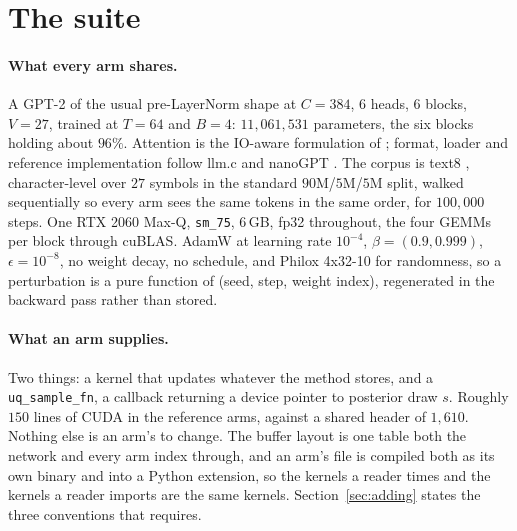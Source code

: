 \section{The suite}
\label{sec:suite}


\paragraph{What every arm shares.}
A GPT-2 \citep{radford2019language} of the usual pre-LayerNorm shape
\citep{vaswani2017attention} at $C = 384$, $6$ heads, $6$ blocks, $V = 27$, trained at
$T = 64$ and $B = 4$: $11{,}061{,}531$ parameters, the six blocks holding about
$96\%$. Attention is the IO-aware formulation of \citet{dao2022flashattention};
format, loader and reference implementation follow llm.c \citep{karpathy2024llmc} and
nanoGPT \citep{karpathy2022nanogpt}. The corpus is text8 \citep{mahoney2011text8},
character-level over $27$ symbols in the standard $90$M/$5$M/$5$M split, walked
sequentially so every arm sees the same tokens in the same order, for $100{,}000$
steps. One RTX 2060 Max-Q, \texttt{sm\_75}, $6$\,GB, fp32 throughout, the four GEMMs
per block through cuBLAS. AdamW \citep{kingma2015adam,loshchilov2019adamw} at learning
rate $10^{-4}$, $\beta = (0.9, 0.999)$, $\epsilon = 10^{-8}$, no weight decay, no
schedule, and Philox 4x32-10 \citep{salmon2011parallel} for randomness, so a
perturbation is a pure function of (seed, step, weight index), regenerated in the
backward pass rather than stored.

\paragraph{What an arm supplies.}
Two things: a kernel that updates whatever the method stores, and a
\texttt{uq\_sample\_fn}, a callback returning a device pointer to posterior draw $s$.
Roughly $150$ lines of CUDA in the reference arms, against a shared header of
$1{,}610$. Nothing else is an arm's to change. The buffer layout is one table both the
network and every arm index through, and an arm's file is compiled both as its own
binary and into a Python extension, so the kernels a reader times and the kernels a
reader imports are the same kernels. Section~\ref{sec:adding} states the three
conventions that requires.

